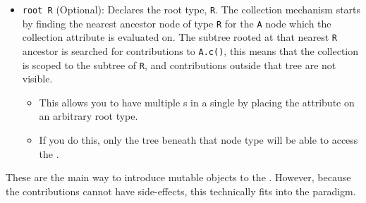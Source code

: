 \begin{definition}
\begin{itemize}[noitemsep]
\begin{itemize}[noitemsep]
    \end{itemize}
  \item \texttt{root R} (Optional): Declares the  root type, \texttt{R}.
    The collection mechanism starts by finding the nearest ancestor node of type \texttt{R} for the \texttt{A} node which the collection attribute is evaluated on.
    The subtree rooted at that nearest \texttt{R} ancestor is searched for contributions to \texttt{A.c()}, this means that the collection is scoped to the subtree of \texttt{R}, and contributions outside that tree are not visible.
    \begin{itemize}[noitemsep]
    \item This allows you to have multiple s in a single  by placing the attribute on an arbitrary root type.
    \item If you do this, only the tree beneath that node type will be able to access the .
    \end{itemize}
  \end{itemize}
  \begin{remark}
    These are the main way to introduce mutable objects to the .
    However, because the contributions cannot have side-effects, this technically fits into the  paradigm.
  \end{remark}
\end{definition}

